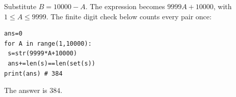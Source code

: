 Substitute $B=10000-A$. The expression becomes $9999A+10000$, with $1\le A\le9999$. The finite digit check below counts every pair once:\begin{verbatim}
ans=0
for A in range(1,10000):
 s=str(9999*A+10000)
 ans+=len(s)==len(set(s))
print(ans) # 384
\end{verbatim}
The answer is $\boxed{384}$.
